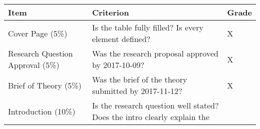\documentclass[11pt,]{article}
\theoremstyle{definition}
\theoremstyle{definition}
\theoremstyle{definition}
\theoremstyle{remark}
\begin{document}
\begin{longtable}[]{@{}lll@{}}
\toprule
\begin{minipage}[b]{0.12\columnwidth}\raggedright\strut
Item\strut
\end{minipage} & \begin{minipage}[b]{0.76\columnwidth}\raggedright\strut
Criterion\strut
\end{minipage} & \begin{minipage}[b]{0.03\columnwidth}\raggedright\strut
Grade\strut
\end{minipage}\tabularnewline
\midrule
\endhead
\begin{minipage}[t]{0.12\columnwidth}\raggedright\strut
Cover Page (5\%)\strut
\end{minipage} & \begin{minipage}[t]{0.76\columnwidth}\raggedright\strut
Is the table fully filled? Is every element defined?\strut
\end{minipage} & \begin{minipage}[t]{0.03\columnwidth}\raggedright\strut
X\strut
\end{minipage}\tabularnewline
\begin{minipage}[t]{0.12\columnwidth}\raggedright\strut
Research Question Approval (5\%)\strut
\end{minipage} & \begin{minipage}[t]{0.76\columnwidth}\raggedright\strut
Was the research proposal approved by 2017-10-09?\strut
\end{minipage} & \begin{minipage}[t]{0.03\columnwidth}\raggedright\strut
X\strut
\end{minipage}\tabularnewline
\begin{minipage}[t]{0.12\columnwidth}\raggedright\strut
Brief of Theory (5\%)\strut
\end{minipage} & \begin{minipage}[t]{0.76\columnwidth}\raggedright\strut
Was the brief of the theory submitted by 2017-11-12?\strut
\end{minipage} & \begin{minipage}[t]{0.03\columnwidth}\raggedright\strut
X\strut
\end{minipage}\tabularnewline
\begin{minipage}[t]{0.12\columnwidth}\raggedright\strut
Introduction (10\%)\strut
\end{minipage} & \begin{minipage}[t]{0.76\columnwidth}\raggedright\strut
Is the research question well stated? Does the intro clearly explain the

\end{minipage}
\end{longtable}
\end{document}
